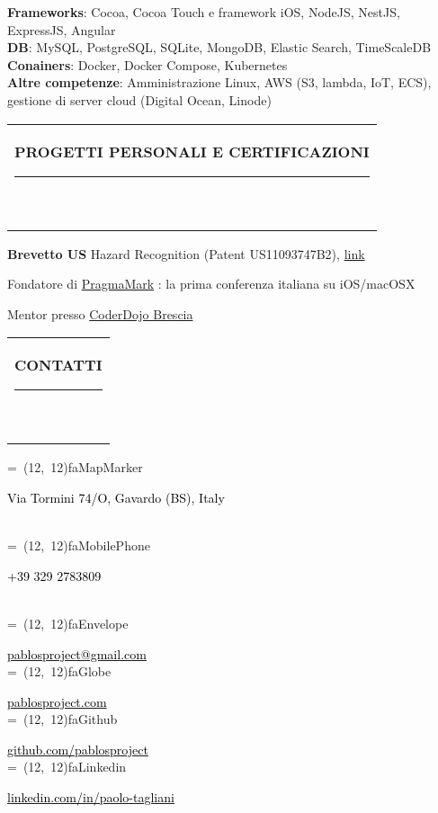 \documentclass[10pt,A4]{article}
\newcommand*{\vcenteredhbox}[1]{\begingroup
\setbox0=\hbox{#1}\parbox{\wd0}{\box0}\endgroup}
\newcommand{\icon}[3] { 							
	\makebox(#2, #2){\textcolor{maincol}{\csname fa#1\endcsname}}
}
\newcommand{\icontext}[4]{ 						
	\vcenteredhbox{\icon{#1}{#2}{#3}}  \hspace{2pt}  \parbox{0.9\mpwidth}{\textcolor{#4}{#3}}
}
\newcommand{\iconhref}[5]{ 						
    \vcenteredhbox{\icon{#1}{#2}{#5}}  \hspace{2pt} \href{#4}{\textcolor{#5}{#3}}
}
\newcommand{\iconemail}[5]{ 						
    \vcenteredhbox{\icon{#1}{#2}{#5}}  \hspace{2pt} \href{mailto:#4}{\textcolor{#5}{#3}}
}
\newcommand{\mpwidth}{\linewidth-\fboxsep-\fboxsep}
\newcommand{\extLink}[2]{
	\textcolor{maincol}{\href{#1}{#2}}
}
\newcommand{\cvlist}[1] {
	\begin{itemize}{#1}\end{itemize}
}
\newcommand{\cvtext}[1] {
	\begin{tabular*}{1\mpwidth}{p{0.98\mpwidth}}
		\parbox{1\mpwidth}{#1}
	\end{tabular*}
}
\newcommand{\cvsection}[1] {
	\vspace{14pt}
	\cvtext{
		\textbf{\LARGE{\textcolor{darkcol}{\uppercase{#1}}}}\\[-4pt]
		\textcolor{maincol}{ \rule{0.1\textwidth}{2pt} } \\
	}
}
\begin{document}
\begin{paracol}{2}
\begin{leftcolumn}
\textbf{Frameworks}: Cocoa, Cocoa Touch e framework iOS, NodeJS, NestJS, ExpressJS, Angular \\

\textbf{DB}: MySQL, PostgreSQL, SQLite, MongoDB, Elastic Search, TimeScaleDB \\

\textbf{Conainers}: Docker, Docker Compose, Kubernetes \\

\textbf{Altre competenze}: Amministrazione Linux, AWS (S3, lambda, IoT, ECS), gestione di server cloud (Digital Ocean, Linode)
 

\cvsection{Progetti personali e certificazioni}
\cvlist{
	\item \textbf{Brevetto US} Hazard Recognition (Patent US11093747B2), \extLink{https://patents.google.com/patent/US11093747B2/en?oq=US11093747B2
}{link}
	\item Fondatore di \extLink{http://pragmamark.org/}{PragmaMark}: la prima conferenza italiana su iOS/macOSX
	\item Mentor presso \extLink{http://www.coderdojobrescia.it/}{CoderDojo Brescia}
}


\mbox{}
\vfill
\mbox{}
\vfill
\mbox{}
\vfill
\mbox{}
\end{leftcolumn}
\begin{rightcolumn}
\vfill \vspace*{110pt}

\cvsection{CONTATTI}
	
\icontext{MapMarker}{12}{Via Tormini 74/O, Gavardo (BS), Italy}{black}\\[6pt]
\icontext{MobilePhone}{12}{+39 329 2783809}{black}\\[6pt]
\iconemail{Envelope}{12}{pablosproject@gmail.com}{pablosproject@gmail.com}{black}\\[6pt]
\iconhref{Globe}{12}{pablosproject.com}{https://www.pablosproject.com}{black}\\[6pt]
\iconhref{Github}{12}{github.com/pablosproject}{https://github.com/pablosproject}{black}\\[6pt]
\iconhref{Linkedin}{12}{linkedin.com/in/paolo-tagliani}{https://www.linkedin.com/in/paolo-tagliani-51248117}{black}\\[6pt]


\end{rightcolumn}
\end{paracol}
\end{document}
